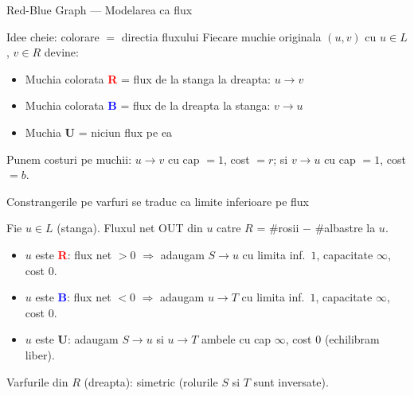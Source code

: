 ﻿\documentclass[9pt]{beamer}
\begin{document}
\begin{frame}[shrink]{Red-Blue Graph --- Modelarea ca flux}
  \begin{block}{Idee cheie: colorare $=$ directia fluxului}
    Fiecare muchie originala $(u,v)$ cu $u\in L$, $v\in R$ devine:
    \begin{itemize}
      \item Muchia colorata \textcolor{red}{\textbf{R}} = flux de la stanga la dreapta: $u\to v$
      \item Muchia colorata \textcolor{blue}{\textbf{B}} = flux de la dreapta la stanga: $v\to u$
      \item Muchia \textbf{U} = niciun flux pe ea
    \end{itemize}
    Punem costuri pe muchii: $u\to v$ cu cap $=1$, cost $=r$;
    si $v\to u$ cu cap $=1$, cost $=b$.
  \end{block}
  \begin{block}{Constrangerile pe varfuri se traduc ca limite inferioare pe flux}
    \begin{footnotesize}
    Fie $u\in L$ (stanga). Fluxul net OUT din $u$ catre $R$ = \#rosii $-$ \#albastre la $u$.\\
    \begin{itemize}
      \item $u$ este \textcolor{red}{\textbf{R}}: flux net $>0$ $\Rightarrow$ adaugam $S\to u$
            cu limita inf.\ $1$, capacitate $\infty$, cost $0$.
      \item $u$ este \textcolor{blue}{\textbf{B}}: flux net $<0$ $\Rightarrow$ adaugam $u\to T$
            cu limita inf.\ $1$, capacitate $\infty$, cost $0$.
      \item $u$ este \textbf{U}: adaugam $S\to u$ si $u\to T$ ambele cu cap $\infty$, cost $0$
            (echilibram liber).
    \end{itemize}
    Varfurile din $R$ (dreapta): simetric (rolurile $S$ si $T$ sunt inversate).
    \end{footnotesize}
  \end{block}
\end{frame}
\end{document}
